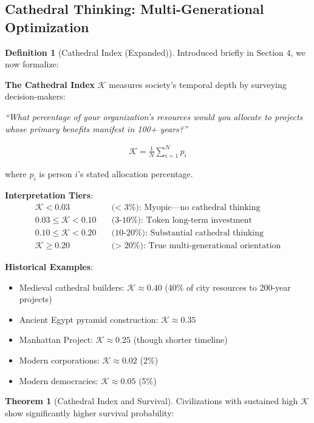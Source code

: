 \documentclass[11pt,a4paper]{article}
\theoremstyle{definition}
\newtheorem{definition}{Definition}[section]
\newtheorem{theorem}{Theorem}[section]
\theoremstyle{remark}
\begin{document}
\begin{small}
\begin{enumerate}
\subsection{Cathedral Thinking: Multi-Generational Optimization}

\begin{definition}[Cathedral Index (Expanded)]
Introduced briefly in Section 4, we now formalize:

\textbf{The Cathedral Index} \(\mathcal{K}\) measures society's temporal depth by surveying decision-makers:

\textit{``What percentage of your organization's resources would you allocate to projects whose primary benefits manifest in 100+ years?''}

\begin{align}
\mathcal{K} = \frac{1}{N} \sum_{i=1}^N p_i
\end{align}

where \(p_i\) is person \(i\)'s stated allocation percentage.

\textbf{Interpretation Tiers}:
\begin{align}
\mathcal{K} < 0.03 &\quad \text{(< 3\%): Myopic—no cathedral thinking} \\
0.03 \leq \mathcal{K} < 0.10 &\quad \text{(3-10\%): Token long-term investment} \\
0.10 \leq \mathcal{K} < 0.20 &\quad \text{(10-20\%): Substantial cathedral thinking} \\
\mathcal{K} \geq 0.20 &\quad \text{(> 20\%): True multi-generational orientation}
\end{align}

\textbf{Historical Examples}:
\begin{itemize}
    \item Medieval cathedral builders: \(\mathcal{K} \approx 0.40\) (40\% of city resources to 200-year projects)
    \item Ancient Egypt pyramid construction: \(\mathcal{K} \approx 0.35\)
    \item Manhattan Project: \(\mathcal{K} \approx 0.25\) (though shorter timeline)
    \item Modern corporations: \(\mathcal{K} \approx 0.02\) (2\%)
    \item Modern democracies: \(\mathcal{K} \approx 0.05\) (5\%)
\end{itemize}
\end{definition}

\begin{theorem}[Cathedral Index and Survival]
Civilizations with sustained high \(\mathcal{K}\) show significantly higher survival probability:


\end{theorem}
\end{enumerate}
\end{small}
\end{document}
